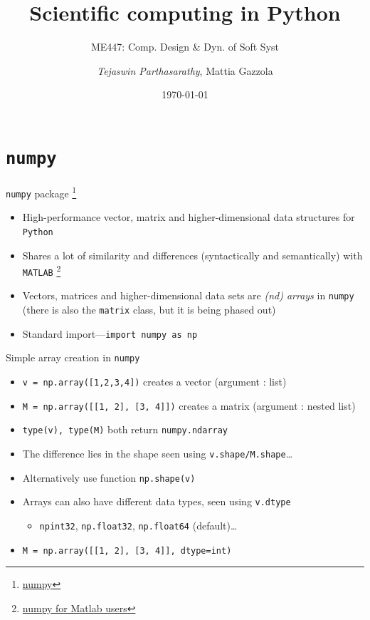 \documentclass[presentation]{beamer}
\author{\emph{Tejaswin Parthasarathy}, Mattia Gazzola}
\date{\today}
\title{Scientific computing in Python}
\subtitle{ME447: Comp. Design \& Dyn. of Soft Syst}
\begin{document}
\maketitle

\section{\texttt{numpy}}
\label{sec:orga56d279}
\begin{frame}[label={sec:org30f73da},fragile]{\texttt{numpy} package \footnote{\href{https://www.numpy.org/}{numpy}}}
 \begin{itemize}
\item High-performance vector, matrix and higher-dimensional data structures for
\texttt{Python}
\item Shares a lot of similarity and differences (syntactically and semantically)
with \texttt{MATLAB} \footnote{\href{https://docs.scipy.org/doc/numpy/user/numpy-for-matlab-users.html}{numpy for Matlab users}}
\item Vectors, matrices and higher-dimensional data sets are \emph{(nd) arrays} in \texttt{numpy}
(there is also the \texttt{matrix} class, but it is being phased out)
\item Standard import---\texttt{import numpy as np}
\end{itemize}
\end{frame}
\begin{frame}[label={sec:org02caaad},fragile]{Simple array creation in \texttt{numpy}}
\begin{itemize}
\item \texttt{v = np.array([1,2,3,4])} creates a vector (argument : list)
\item \texttt{M = np.array([[1, 2], [3, 4]])} creates a matrix (argument : nested list)
\item \texttt{type(v), type(M)} both return \texttt{numpy.ndarray}
\item The difference lies in the \alert{shape} seen using \texttt{v.shape/M.shape}\ldots{}
\item Alternatively use function \texttt{np.shape(v)}
\item Arrays can also have different data types, seen using \texttt{v.dtype}
\begin{itemize}
\item \texttt{npint32}, \texttt{np.float32}, \texttt{np.float64} (default)\ldots{}
\end{itemize}
\item \texttt{M = np.array([[1, 2], [3, 4]], dtype=int)}
\end{itemize}
\end{frame}
\end{document}
